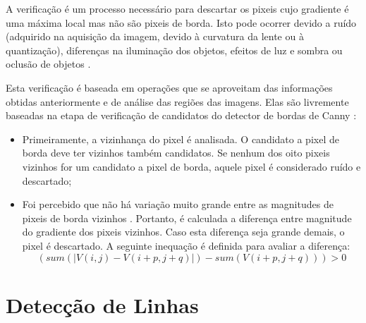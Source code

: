A verificação é um processo necessário para descartar os pixeis cujo gradiente é uma máxima local mas não são pixeis de borda. Isto pode ocorrer devido a ruído (adquirido na aquisição da imagem, devido à curvatura da lente ou à quantização), diferenças na iluminação dos objetos, efeitos de luz e sombra ou oclusão de objetos \cite{ruidocausas}.


Esta verificação é baseada em operações que se aproveitam das informações obtidas anteriormente e de análise das regiões das imagens. Elas são livremente baseadas na etapa de verificação de candidatos do detector de bordas de Canny \cite{canny}:


\begin{itemize}
\item Primeiramente, a vizinhança do pixel é analisada. O candidato a pixel de borda deve ter vizinhos também candidatos. Se nenhum dos oito pixeis vizinhos for um candidato a pixel de borda, aquele pixel é considerado ruído e descartado;
\item Foi percebido que não há variação muito grande entre as magnitudes de pixeis de borda vizinhos \cite{mrf}. Portanto, é calculada a diferença entre magnitude do gradiente dos pixeis vizinhos. Caso esta diferença seja grande demais, o pixel é descartado. A seguinte inequação é definida para avaliar a diferença:
\begin{equation}
(sum(| V(i,j) - V(i+p,j+q) |)- sum(V(i+p,j+q))) >0
\end{equation}


\end {itemize}

\section{Detecção de Linhas} \label{met:linha}



